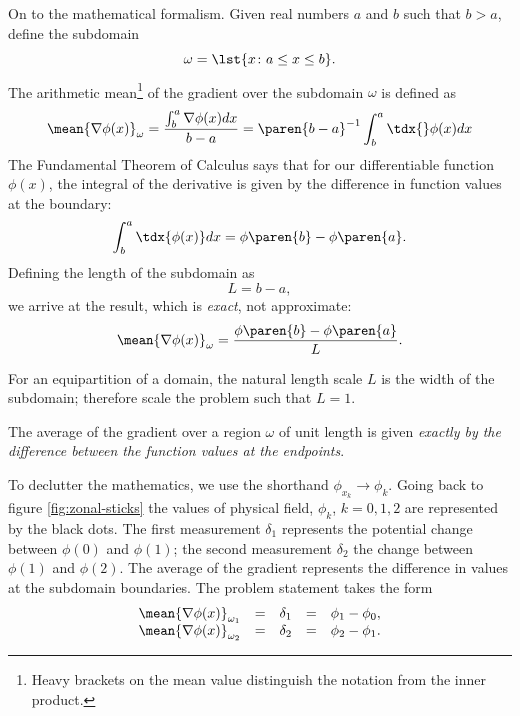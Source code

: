 On to the mathematical formalism. Given real numbers $a$ and $b$ such that $b>a$, define the subdomain 
%
\begin{equation*}
	\omega = \lst{x\colon a\le x \le b}.
\end{equation*}
%
The arithmetic mean\footnote{Heavy brackets on the mean value distinguish the notation from the inner product.} of the gradient over the subdomain $\omega$ is defined as
%
\begin{equation}
	\mean{\nabla \phi(x)}_{\omega} =
	\frac
	{\int_{b}^{a}\nabla \phi(x)dx} {b-a} =
	\paren{b-a}^{-1} \int_{b}^{a}\tdx {}\phi(x)dx
\end{equation}
%
The Fundamental Theorem of Calculus\cite[p. 190, equation 31]{courant1998} says that for our differentiable function $\phi(x)$, the integral of the derivative is given by the difference in function values at the boundary:
%
\begin{equation*}
	\int_{b}^{a}\tdx {\phi(x)}dx = \phi\paren{b} -  \phi\paren{a}.
\end{equation*}
%
Defining the length of the subdomain as
%
\begin{equation*}
	L = b - a ,
\end{equation*}
%
we arrive at the result, which is \emph{exact}, not approximate:
\begin{equation}
	\mean{\nabla \phi(x)}_{\omega} =
	 \frac{ \phi\paren{b} -  \phi\paren{a} } {L}.
\label{eq:ch-01 average gradient}
\end{equation}

For an equipartition of a domain, the natural length scale $L$ is the width of the subdomain; therefore scale the problem such that $L=1$.

The average of the gradient over a region $\omega$ of unit length is given \emph{exactly by the difference between the function values at the endpoints}.

To declutter the mathematics, we use the shorthand $\phi_{x_{k}} \rightarrow \phi_{k}$. Going back to figure \ref{fig:zonal-sticks} the values of physical field, $\phi_{k}$, $k=0,1,2$ are represented by the black dots. The first measurement $\delta_{1}$ represents the potential change between $\phi(0)$ and $\phi(1)$; the second measurement $\delta_{2}$ the change between $\phi(1)$ and $\phi(2)$. The average of the gradient represents the difference in values at the subdomain boundaries.  The problem statement takes the form
%
\begin{equation}
	\begin{array}{ccccc}
		\mean{\nabla \phi(x)}_{\omega_{1}} &=& \delta_{1} &=& \phi_{1} - \phi_{0}, \\
		\mean{\nabla \phi(x)}_{\omega_{2}} &=& \delta_{2} &=& \phi_{2} - \phi_{1}. 
	\end{array}
\label{eq:ch-01-fd}
\end{equation}
%

